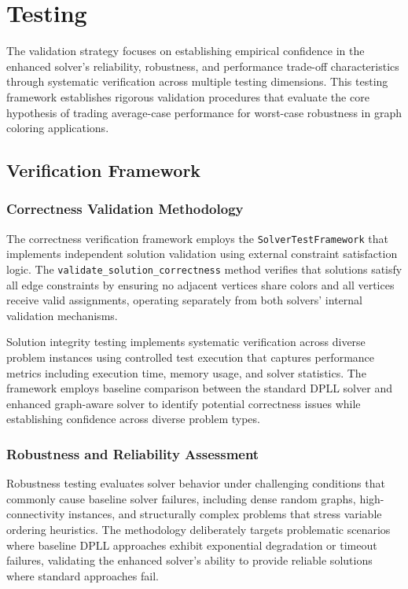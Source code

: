 \section{Testing}
\label{sec:testing}

The validation strategy focuses on establishing empirical confidence in the enhanced solver's reliability, robustness, and performance trade-off characteristics through systematic verification across multiple testing dimensions. This testing framework establishes rigorous validation procedures that evaluate the core hypothesis of trading average-case performance for worst-case robustness in graph coloring applications.

\subsection{Verification Framework}
\label{sec:verification-framework}

\subsubsection{Correctness Validation Methodology}
\label{sec:correctness-validation}
The correctness verification framework employs the \texttt{SolverTestFramework} that implements independent solution validation using external constraint satisfaction logic. The \texttt{validate\_solution\_correctness} method verifies that solutions satisfy all edge constraints by ensuring no adjacent vertices share colors and all vertices receive valid assignments, operating separately from both solvers' internal validation mechanisms.

Solution integrity testing implements systematic verification across diverse problem instances using controlled test execution that captures performance metrics including execution time, memory usage, and solver statistics. The framework employs baseline comparison between the standard DPLL solver and enhanced graph-aware solver to identify potential correctness issues while establishing confidence across diverse problem types.

\subsubsection{Robustness and Reliability Assessment}
\label{sec:robustness-assessment}
Robustness testing evaluates solver behavior under challenging conditions that commonly cause baseline solver failures, including dense random graphs, high-connectivity instances, and structurally complex problems that stress variable ordering heuristics. The methodology deliberately targets problematic scenarios where baseline DPLL approaches exhibit exponential degradation or timeout failures, validating the enhanced solver's ability to provide reliable solutions where standard approaches fail.

